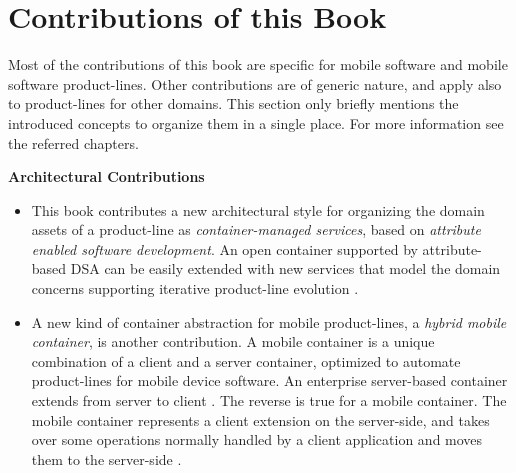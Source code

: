 \section{Contributions of this Book}

Most of the contributions of this book are specific for mobile software and mobile software product-lines. Other contributions are of generic nature, and apply also to product-lines for other domains. This section only briefly mentions the introduced concepts to organize them in a single place. For more information see the referred chapters.

\noindent \textbf{Architectural Contributions}
\begin{itemize}

\item This book contributes a new architectural style for organizing the domain assets of a product-line as \textit{container-managed services}, based on \textit{attribute enabled software development}. An open container supported by attribute-based DSA can be easily extended with new services that model the domain concerns supporting iterative product-line evolution .

\item A new kind of container abstraction for mobile product-lines, a \textit{hybrid mobile container}, is another contribution. A mobile container is a unique combination of a client and a server container, optimized to automate product-lines for mobile device software. An enterprise server-based container extends from server to client \cite{server.patterns.02}. The reverse is true for a mobile container. The mobile container represents a client extension on the server-side, and takes over some operations normally handled by a client application and moves them to the server-side .
\end{itemize}

